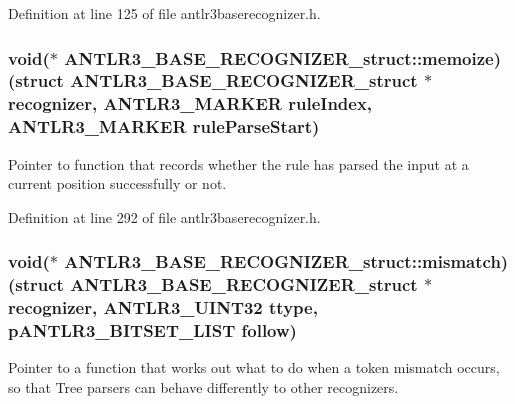 Definition at line 125 of file antlr3baserecognizer.\-h.

\hypertarget{struct_a_n_t_l_r3___b_a_s_e___r_e_c_o_g_n_i_z_e_r__struct_a7d5834d01d2619a5d110f8554aba2074}{
\subsubsection[{memoize}]{\setlength{\rightskip}{0pt plus 5cm}void($\ast$ A\-N\-T\-L\-R3\-\_\-\-B\-A\-S\-E\-\_\-\-R\-E\-C\-O\-G\-N\-I\-Z\-E\-R\-\_\-struct\-::memoize)(struct {\bf A\-N\-T\-L\-R3\-\_\-\-B\-A\-S\-E\-\_\-\-R\-E\-C\-O\-G\-N\-I\-Z\-E\-R\-\_\-struct} $\ast${\bf recognizer}, {\bf A\-N\-T\-L\-R3\-\_\-\-M\-A\-R\-K\-E\-R} rule\-Index, {\bf A\-N\-T\-L\-R3\-\_\-\-M\-A\-R\-K\-E\-R} rule\-Parse\-Start)}}\label{struct_a_n_t_l_r3___b_a_s_e___r_e_c_o_g_n_i_z_e_r__struct_a7d5834d01d2619a5d110f8554aba2074}
Pointer to function that records whether the rule has parsed the input at a current position successfully or not. 

Definition at line 292 of file antlr3baserecognizer.\-h.

\hypertarget{struct_a_n_t_l_r3___b_a_s_e___r_e_c_o_g_n_i_z_e_r__struct_a1dad3b431fc5e76173b78f0d2a1ef00d}{
\subsubsection[{mismatch}]{\setlength{\rightskip}{0pt plus 5cm}void($\ast$ A\-N\-T\-L\-R3\-\_\-\-B\-A\-S\-E\-\_\-\-R\-E\-C\-O\-G\-N\-I\-Z\-E\-R\-\_\-struct\-::mismatch)(struct {\bf A\-N\-T\-L\-R3\-\_\-\-B\-A\-S\-E\-\_\-\-R\-E\-C\-O\-G\-N\-I\-Z\-E\-R\-\_\-struct} $\ast${\bf recognizer}, {\bf A\-N\-T\-L\-R3\-\_\-\-U\-I\-N\-T32} ttype, {\bf p\-A\-N\-T\-L\-R3\-\_\-\-B\-I\-T\-S\-E\-T\-\_\-\-L\-I\-S\-T} {\bf follow})}}\label{struct_a_n_t_l_r3___b_a_s_e___r_e_c_o_g_n_i_z_e_r__struct_a1dad3b431fc5e76173b78f0d2a1ef00d}
Pointer to a function that works out what to do when a token mismatch occurs, so that Tree parsers can behave differently to other recognizers. 

